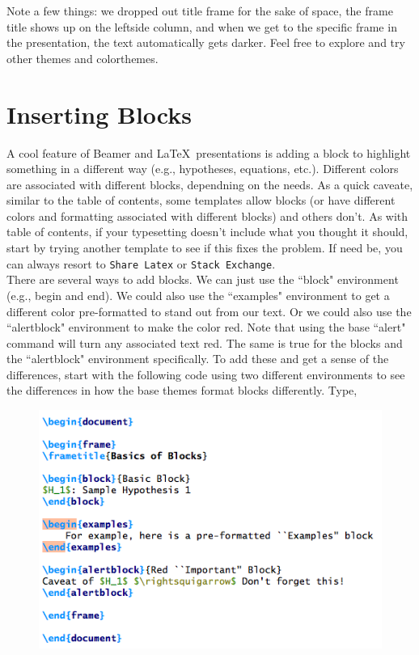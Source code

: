 \documentclass[11pt]{article}
\newcommand{\forceindent}{\leavevmode{\parindent=1.5em\indent}} %
\begin{document}
\newpage

Note a few things: we dropped out title frame for the sake of space, the frame title shows up on the leftside column, and when we get to the specific frame in the presentation, the text automatically gets darker.  Feel free to explore and try other themes and colorthemes. 


\newpage

\section{Inserting Blocks}

\forceindent A cool feature of Beamer and \LaTeX\ presentations is adding a block to highlight something in a different way (e.g., hypotheses, equations, etc.). Different colors are associated with different blocks, dependning on the needs. As a quick caveate, similar to the table of contents, some templates allow blocks (or have different colors and formatting associated with different blocks) and others don't. As with table of contents, if your typesetting doesn't include what you thought it should, start by trying another template to see if this fixes the problem. If need be, you can always resort to \texttt{Share Latex} or \texttt{Stack Exchange}. \\
	
There are several ways to add blocks. We can just use the ``block" environment (e.g., begin and end). We could also use the ``examples" environment to get a different color pre-formatted to stand out from our text. Or we could also use the ``alertblock" environment to make the color red. Note that using the base ``alert" command will turn any associated text red. The same is true for the blocks and the ``alertblock" environment specifically. To add these and get a sense of the differences, start with the following code using two different environments to see the differences in how the base themes format blocks differently. Type, \\

\begin{figure}[!h]
	\includegraphics[scale=.5]{CODE6}
	\centering
\end{figure}
\end{document}
